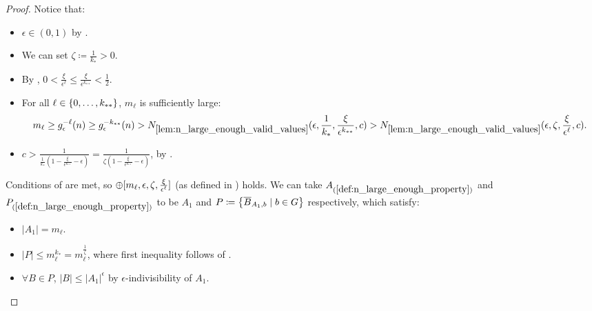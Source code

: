 \begin{lemma}
\begin{proof}
                Notice that:
                \begin{itemize}
                    \item $\epsilon \in (0,1)$ by .
                    \item We can set $\zeta \coloneqq \frac{1}{k_*} > 0$.
                    \item By ,
                        $0 < \frac{\xi}{\epsilon^\ell} \leq \frac{\xi}{\epsilon^{k_{**}}} < \frac{1}{2}$.
                    \item For all $\ell \in \{ 0,\dots,k_{**} \}$, $m_\ell$ is sufficiently large:
                        \[
                            m_\ell \geq g_\epsilon^{-\ell}(n) \geq g_\epsilon^{-k_{**}}(n)
                                > N_{\ref{lem:n_large_enough_valid_values}}( \epsilon, \frac{1}{k_*}, \frac{\xi}{\epsilon^{k_{**}}}, c )
                                > N_{\ref{lem:n_large_enough_valid_values}}( \epsilon, \zeta, \frac{\xi}{\epsilon^{\ell}}, c ).
                        \]
                    \item $c > \frac{1}{\frac{1}{k_*} (1 - \frac{\xi}{\epsilon^{k_{**}}} - \epsilon)}
                        = \frac{1}{\zeta (1 - \frac{\xi}{\epsilon^{k_{**}}} - \epsilon)}$, by .
                \end{itemize}
                Conditions of  are met, so
                $\oplus[ m_\ell, \epsilon, \zeta, \frac{\xi}{\epsilon^\ell} ]$
                (as defined in ) holds.
                We can take $A_{(\ref{def:n_large_enough_property})}$ and $P_{(\ref{def:n_large_enough_property})}$ to be
                $A_1$ and $P \coloneqq \bigl\{ \overline{B}_{A_1,b} \mid b \in G \bigr\}$ respectively, which satisfy:
                \begin{itemize}
                    \item $|A_1| = m_\ell$.
                    \item $|P| \leq m_\ell^{k_*} = m_\ell^{\frac{1}{\zeta}}$, where first inequality follows 
                        of .
                    \item $\forall B \in P$, $|B| \leq |A_1|^\epsilon$ by $\epsilon$-indivisibility of $A_1$.

\end{itemize}
\end{proof}
\end{lemma}

